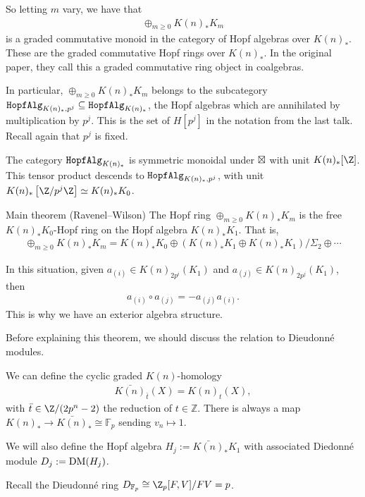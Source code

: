 So letting $m$ vary, we have that
\begin{align*}
    \oplus_{m\ge 0} K(n)_\ast K_m
\end{align*}
is a graded commutative monoid in the category of Hopf algebras over $K(n)_\ast$. These are the graded commutative Hopf rings over $K(n)_\ast$. In the original paper, they call this a graded commutative ring object in coalgebras.

In particular, $\oplus_{m\ge 0} K(n)_\ast K_m$ belongs to the subcategory $\texttt{HopfAlg}_{K(n)_\ast,p^j} \subseteq \texttt{HopfAlg}_{K(n)_\ast}$, the Hopf algebras which are annihilated by multiplication by $p^j$. This is the set of $H[p^j]$ in the notation from the last talk. Recall again that $p^j$ is fixed.

The category $\texttt{HopfAlg}_{K(n)_\ast}$ is symmetric monoidal under $\boxtimes$ with unit $K(n)_\ast [\Z]$. This tensor product descends to $\texttt{HopfAlg}_{K(n)_\ast,p^j}$, with unit $K(n)_\ast \left[ \Z/p^j \Z \right]\simeq K(n)_\ast K_0$.

\begin{customenvironment}{Main theorem} (Ravenel--Wilson) The Hopf ring $\oplus_{m\ge 0} K(n)_\ast K_m$ is the free $K(n)_\ast K_0$-Hopf ring on the Hopf algebra $K(n)_\ast K_1$. That is,
\begin{align*}
    \oplus_{m\ge 0} K(n)_\ast K_m = K(n)_\ast K_0 \oplus \left(K(n)_\ast K_1 \oplus K(n)_\ast K_1 \right)/\Sigma_2 \oplus \cdots
\end{align*}
\end{customenvironment}

\begin{remark} In this situation, given $a_{(i)} \in K(n)_{2p^i}(K_1)$ and $a_{(j)} \in K(n)_{2p^j}(K_1)$, then
\begin{align*}
    a_{(i)} \circ a_{(j)} = - a_{(j)} a_{(i)}.
\end{align*}
This is why we have an exterior algebra structure.
\end{remark}

Before explaining this theorem, we should discuss the relation to Dieudonn\'e modules.

\begin{notation} We can define the cyclic graded $K(n)$-homology
\begin{align*}
    \bar{K(n)}_{\bar{t}}(X) = K(n)_t(X),
\end{align*}
with $\bar{t} \in \Z/(2p^n-2)$ the reduction of $t\in \mathbb{Z}$. There is always a map $K(n)_\ast \to \bar{K(n)}_\ast \cong \mathbb{F}_p$ sending $v_n \mapsto 1$.

We will also define the Hopf algebra $H_j := \bar{K(n)}_\ast K_1$ with associated Diedonn\'e module $D_j :=\text{DM}(H_j)$.

Recall the Dieudonn\'e ring $D_{\mathbb{F}_p} \cong \Z_p[F,V]/FV=p$.
\end{notation}

